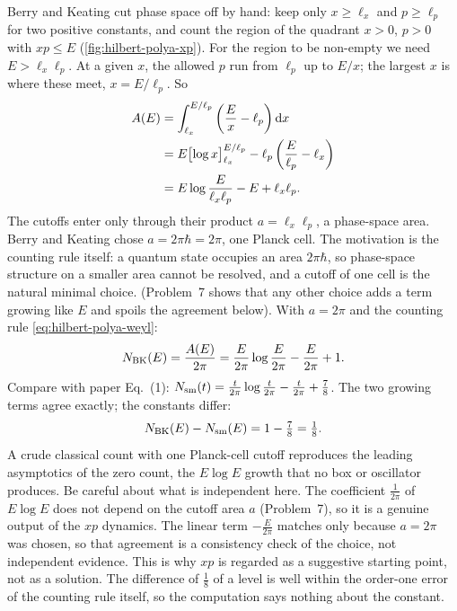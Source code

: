 Berry and Keating cut phase space off by hand: keep only $x\ge\ell_x$ and $p\ge\ell_p$ for two positive constants, and count the region of the quadrant $x>0$, $p>0$ with $xp\le E$ (\cref{fig:hilbert-polya-xp}). For the region to be non-empty we need $E>\ell_x\ell_p$. At a given $x$, the allowed $p$ run from $\ell_p$ up to $E/x$; the largest $x$ is where these meet, $x=E/\ell_p$. So
\begin{align}
A(E)&=\int_{\ell_x}^{E/\ell_p}\left(\frac Ex-\ell_p\right)\mathrm{d} x\notag\\
&=E\bigl[\log x\bigr]_{\ell_x}^{E/\ell_p}-\ell_p\left(\frac{E}{\ell_p}-\ell_x\right)\notag\\
&=E\log\frac{E}{\ell_x\ell_p}-E+\ell_x\ell_p .
\label{eq:hilbert-polya-area}
\end{align}
The cutoffs enter only through their product $a=\ell_x\ell_p$, a phase-space area. Berry and Keating chose $a=2\pi\hbar=2\pi$, one Planck cell. The motivation is the counting rule itself: a quantum state occupies an area $2\pi\hbar$, so phase-space structure on a smaller area cannot be resolved, and a cutoff of one cell is the natural minimal choice. (Problem~7 shows that any other choice adds a term growing like $E$ and spoils the agreement below). With $a=2\pi$ and the counting rule \eqref{eq:hilbert-polya-weyl}:
\begin{equation}
N_{\rm BK}(E)=\frac{A(E)}{2\pi}=\frac{E}{2\pi}\log\frac{E}{2\pi}-\frac{E}{2\pi}+1 .
\label{eq:hilbert-polya-nbk}
\end{equation}
Compare with paper Eq.~(1): $N_{\mathrm{sm}}(t)=\frac{t}{2\pi}\log\frac{t}{2\pi}-\frac{t}{2\pi}+\frac78$. The two growing terms agree exactly; the constants differ:
\begin{equation}
N_{\rm BK}(E)-N_{\mathrm{sm}}(E)=1-\tfrac78=\tfrac18 .
\label{eq:hilbert-polya-eighth}
\end{equation}
A crude classical count with one Planck-cell cutoff reproduces the leading asymptotics of the zero count, the $E\log E$ growth that no box or oscillator produces. Be careful about what is independent here. The coefficient $\frac{1}{2\pi}$ of $E\log E$ does not depend on the cutoff area $a$ (Problem~7), so it is a genuine output of the $xp$ dynamics. The linear term $-\frac{E}{2\pi}$ matches only because $a=2\pi$ was chosen, so that agreement is a consistency check of the choice, not independent evidence. This is why $xp$ is regarded as a suggestive starting point, not as a solution. The difference of $\tfrac18$ of a level is well within the order-one error of the counting rule itself, so the computation says nothing about the constant.

